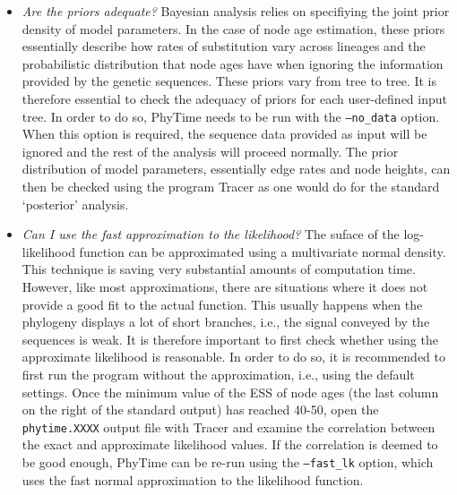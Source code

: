 \documentclass[a4paper,12pt]{article}
\newcommand{\x}[1]{\texttt{#1}}
\begin{document}
\begin{itemize}
\item {\em  Are the priors adequate?} Bayesian  analysis relies on  specifiying the joint
prior density  of model parameters.  In  the case of  node age estimation, these  priors essentially
describe how rates of substitution vary across lineages and the probabilistic distribution that node
ages have when  ignoring the information provided  by the genetic sequences. These  priors vary from
tree to tree. It is therefore essential to  check the adequacy of priors for each user-defined input
tree. In order to do so, PhyTime needs to be run with the \x{--no\_data} option. When this option is
required, the  sequence data provided  as input will  be ignored and the  rest of the  analysis will
proceed  normally. The  prior distribution  of  model parameters,  essentially edge  rates and  node
heights, can then be  checked using the program Tracer as one would  do for the standard `posterior'
analysis.

\item {\em  Can I use the  fast approximation to the  likelihood?} The suface  of the log-likelihood
function can  be approximated using  a multivariate normal  density.  This technique is  saving very
substantial amounts  of computation  time. However, like  most approximations, there  are situations
where it does not provide a good fit to the actual function. This usually happens when the phylogeny
displays  a lot  of short  branches, i.e.,  the  signal conveyed  by the  sequences is  weak. It  is
therefore important to first check whether  using the approximate likelihood is reasonable. In order
to do  so, it is  recommended to first  run the program without  the approximation, i.e.,  using the
default settings. Once  the minimum value of the ESS  of node ages (the last column  on the right of
the  standard output)  has reached  40-50, open  the \x{phytime.XXXX}  output file  with  Tracer and
examine the correlation  between the exact and approximate likelihood values.  If the correlation is
deemed to be good enough, PhyTime can be re-run using the \x{--fast\_lk} option, which uses the fast
normal approximation to the likelihood function.





\end{itemize}
\end{document}
